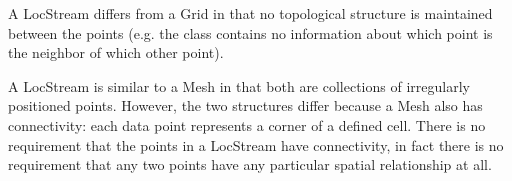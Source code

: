 A LocStream differs from a Grid in that no topological structure is
maintained between the points
(e.g. the class contains no information about which point is the neighbor
of which other point).

A LocStream is similar to a Mesh in that both are collections of irregularly positioned 
points.  However, the two structures differ because a Mesh also has connectivity: 
each data point represents a corner of a defined cell. There is no requirement that the
points in a LocStream have connectivity, in fact there is no requirement that any two points 
have any particular spatial relationship at all.
